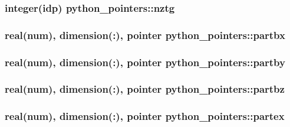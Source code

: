 \subsubsection[{\texorpdfstring{nztg}{nztg}}]{\setlength{\rightskip}{0pt plus 5cm}integer(idp) python\+\_\+pointers\+::nztg}\hypertarget{namespacepython__pointers_a46103f36ebf9246b4fb558d8ceaee49d}{}\label{namespacepython__pointers_a46103f36ebf9246b4fb558d8ceaee49d}
\subsubsection[{\texorpdfstring{partbx}{partbx}}]{\setlength{\rightskip}{0pt plus 5cm}real(num), dimension(\+:), pointer python\+\_\+pointers\+::partbx}\hypertarget{namespacepython__pointers_a9de58f9a1f88381cac4457014ee8859f}{}\label{namespacepython__pointers_a9de58f9a1f88381cac4457014ee8859f}
\subsubsection[{\texorpdfstring{partby}{partby}}]{\setlength{\rightskip}{0pt plus 5cm}real(num), dimension(\+:), pointer python\+\_\+pointers\+::partby}\hypertarget{namespacepython__pointers_aab1fc483934951de61c30198fa476e40}{}\label{namespacepython__pointers_aab1fc483934951de61c30198fa476e40}
\subsubsection[{\texorpdfstring{partbz}{partbz}}]{\setlength{\rightskip}{0pt plus 5cm}real(num), dimension(\+:), pointer python\+\_\+pointers\+::partbz}\hypertarget{namespacepython__pointers_a9c50a4b64ff01114243eebc0dc729ae8}{}\label{namespacepython__pointers_a9c50a4b64ff01114243eebc0dc729ae8}
\subsubsection[{\texorpdfstring{partex}{partex}}]{\setlength{\rightskip}{0pt plus 5cm}real(num), dimension(\+:), pointer python\+\_\+pointers\+::partex}\hypertarget{namespacepython__pointers_ad4fc57017cff184e92ae60ff0006c62c}{}\label{namespacepython__pointers_ad4fc57017cff184e92ae60ff0006c62c}
